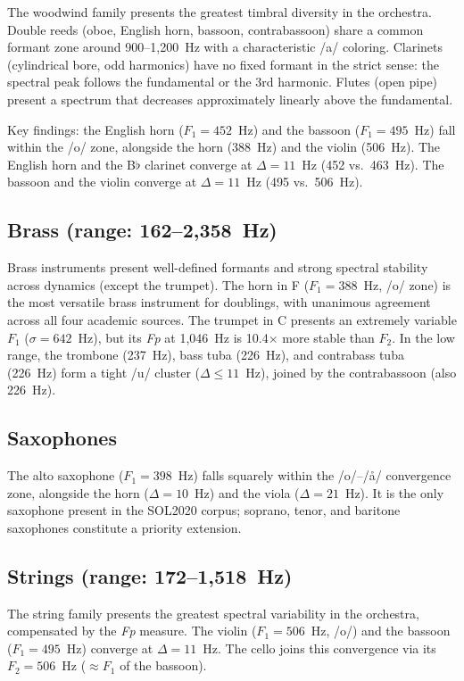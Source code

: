 \documentclass[12pt,a4paper]{article}
\begin{document}
The woodwind family presents the greatest timbral diversity in the orchestra.
Double reeds (oboe, English horn, bassoon, contrabassoon) share a common
formant zone around 900--1,200~Hz with a characteristic /a/ coloring. Clarinets
(cylindrical bore, odd harmonics) have no fixed formant in the strict sense:
the spectral peak follows the fundamental or the 3rd harmonic. Flutes (open
pipe) present a spectrum that decreases approximately linearly above the
fundamental.

Key findings: the English horn ($F_1 = 452$~Hz) and the bassoon
($F_1 = 495$~Hz) fall within the /o/ zone, alongside the horn (388~Hz) and the
violin (506~Hz). The English horn and the B$\flat$ clarinet converge at
$\Delta = 11$~Hz (452 vs.\ 463~Hz). The bassoon and the violin converge at
$\Delta = 11$~Hz (495 vs.\ 506~Hz).

\subsection{Brass (range: 162--2,358~Hz)}

Brass instruments present well-defined formants and strong spectral stability
across dynamics (except the trumpet). The horn in F ($F_1 = 388$~Hz, /o/ zone)
is the most versatile brass instrument for doublings, with unanimous agreement
across all four academic sources. The trumpet in C presents an extremely
variable $F_1$ ($\sigma = 642$~Hz), but its \textit{Fp} at 1,046~Hz is
10.4$\times$ more stable than $F_2$. In the low range, the trombone (237~Hz),
bass tuba (226~Hz), and contrabass tuba (226~Hz) form a tight /u/ cluster
($\Delta \leq 11$~Hz), joined by the contrabassoon (also 226~Hz).

\subsection{Saxophones}

The alto saxophone ($F_1 = 398$~Hz) falls squarely within the /o/--/\aa/
convergence zone, alongside the horn ($\Delta = 10$~Hz) and the viola
($\Delta = 21$~Hz). It is the only saxophone present in the SOL2020 corpus;
soprano, tenor, and baritone saxophones constitute a priority extension.

\subsection{Strings (range: 172--1,518~Hz)}

The string family presents the greatest spectral variability in the orchestra,
compensated by the \textit{Fp} measure. The violin ($F_1 = 506$~Hz, /o/) and
the bassoon ($F_1 = 495$~Hz) converge at $\Delta = 11$~Hz. The cello joins
this convergence via its $F_2 = 506$~Hz ($\approx F_1$ of the bassoon).
\end{document}
